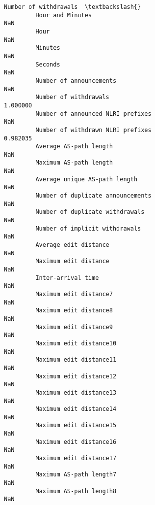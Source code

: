 \documentclass[11pt]{article}
\begin{document}
\begin{Verbatim}[commandchars=\\\{\}]
                                                            Number of withdrawals  \textbackslash{}
         Hour and Minutes                                                     NaN   
         Hour                                                                 NaN   
         Minutes                                                              NaN   
         Seconds                                                              NaN   
         Number of announcements                                              NaN   
         Number of withdrawals                                           1.000000   
         Number of announced NLRI prefixes                                    NaN   
         Number of withdrawn NLRI prefixes                               0.982035   
         Average AS-path length                                               NaN   
         Maximum AS-path length                                               NaN   
         Average unique AS-path length                                        NaN   
         Number of duplicate announcements                                    NaN   
         Number of duplicate withdrawals                                      NaN   
         Number of implicit withdrawals                                       NaN   
         Average edit distance                                                NaN   
         Maximum edit distance                                                NaN   
         Inter-arrival time                                                   NaN   
         Maximum edit distance7                                               NaN   
         Maximum edit distance8                                               NaN   
         Maximum edit distance9                                               NaN   
         Maximum edit distance10                                              NaN   
         Maximum edit distance11                                              NaN   
         Maximum edit distance12                                              NaN   
         Maximum edit distance13                                              NaN   
         Maximum edit distance14                                              NaN   
         Maximum edit distance15                                              NaN   
         Maximum edit distance16                                              NaN   
         Maximum edit distance17                                              NaN   
         Maximum AS-path length7                                              NaN   
         Maximum AS-path length8                                              NaN   

\end{Verbatim}
\end{document}
